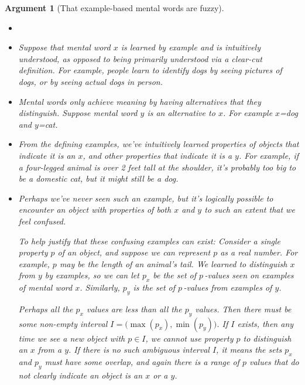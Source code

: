 \documentclass[11pt, oneside]{article}   	%
\newtheorem{argt}{Argument}
\begin{document}
\begin{argt}[That example-based mental words are fuzzy]
    \label{a5}
    \normalfont
    \begin{itemize}
        \item[]
        \item Suppose that mental word $x$ is learned by example and is
            intuitively understood, as opposed to being primarily understood via
            a clear-cut definition.
            For
            example, people learn to identify {\em dogs}
            by seeing pictures of dogs, 
            or by seeing actual dogs in person.
        \item Mental words only achieve meaning by having alternatives that they
            distinguish. Suppose mental word $y$ is an alternative to $x$.
            For example $x$={\em dog} and $y$={\em cat}.
        \item From the defining examples, we've intuitively learned properties
            of objects
            that indicate it is an $x$, and other properties that indicate it is
            a $y$. For example, if a four-legged animal is over 2 feet tall at
            the
            shoulder, it's probably too big to be a domestic cat, but it might
            still be a dog.
        \item Perhaps we've never seen such an example, but it's logically
            possible to encounter an object with properties of both $x$ and $y$
            to such an extent that we feel confused.

            To help justify that these confusing examples can exist:
            Consider a single property $p$
            of an object, and suppose we can represent $p$ as a real number. For
            example, $p$ may be the length of an animal's tail. We learned to
            distinguish $x$ from $y$ by examples, so we can let $p_x$ be the set
            of $p$\,-values seen on examples of mental word $x$. Similarly, $p_y$
            is the set of $p$\,-values from examples of $y$.

            Perhaps all the $p_x$ values are less than all the $p_y$ values.
            Then there must be some non-empty interval
            $I=\big(\!\max(p_x), \min(p_y)\big)$.
            If $I$ exists, then any time we see a new object with $p\in I$, we
            cannot use property $p$ to distinguish an $x$ from a $y$. If there
            is no such ambiguous interval $I$, it means the sets $p_x$ and $p_y$
            must have some overlap, and again there is a range of $p$ values
            that do not clearly indicate an object is an $x$ or a $y$.


\end{itemize}
\end{argt}
\end{document}
